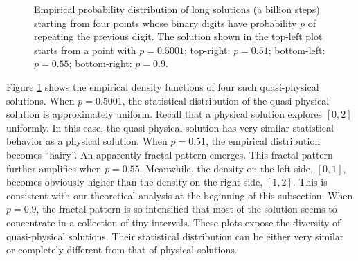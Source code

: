 \begin{figure}
\caption{Empirical probability distribution of long solutions (a billion steps)
starting from four points whose binary digits have probability $p$ of
repeating the previous digit.
The solution shown in the top-left plot starts from a point with $p=0.5001$;
top-right: $p=0.51$; bottom-left: $p=0.55$; bottom-right: $p=0.9$.
}
\label{fig:tent_quasiphysical}
\end{figure}

Figure \ref{fig:tent_quasiphysical} shows the empirical density functions of
four such quasi-physical solutions.  When $p=0.5001$,
the statistical distribution of the quasi-physical solution
is approximately uniform.  Recall that a physical solution explores $[0,2]$
uniformly.  In this case, the quasi-physical solution has very similar
statistical behavior as a physical solution.  When $p=0.51$, the empirical
distribution becomes ``hairy''.  An apparently fractal pattern emerges.
This fractal pattern further amplifies when $p=0.55$.  Meanwhile,
the density on the left side, $[0,1]$, becomes obviously higher than
the density on the right side, $[1,2]$.  This is consistent with our
theoretical analysis at the beginning of this subsection.
When $p=0.9$, the fractal pattern is so intensified that most
of the solution seems to concentrate in a collection of tiny intervals.
These plots expose the diversity of quasi-physical solutions.
Their statistical distribution can be either
very similar or completely different from that of physical solutions.

